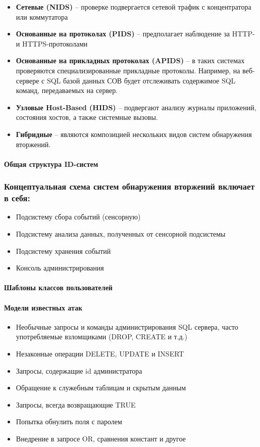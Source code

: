 \begin{itemize}
	\item \textbf{Сетевые (NIDS)} -- проверке подвергается сетевой трафик с концентратора или коммутатора
	\item \textbf{Основанные на протоколах (PIDS)} -- предполагает наблюдение за HTTP- и HTTPS-протоколами
	\item \textbf{Основанные на прикладных протоколах (APIDS)} -- в таких системах проверяются специализированные прикладные протоколы. Например, на веб-сервере с SQL базой данных СОВ будет отслеживать содержимое SQL команд, передаваемых на сервер.
	\item \textbf{Узловые Host-Based (HIDS)} -- подвергают анализу журналы приложений, состояния хостов, а также системные вызовы.
	\item \textbf{Гибридные} -- являются композицией нескольких видов систем обнаружения вторжений.
\end{itemize}

\paragraph{Общая структура ID-систем} 

\subsubsection*{Концептуальная схема систем обнаружения вторжений включает в себя:}
\begin{itemize}
	\item Подсистему сбора событий (сенсорную)
	\item Подсистему анализа данных, полученных от сенсорной подсистемы
	\item Подсистему хранения событий
	\item Консоль администрирования
\end{itemize}

\paragraph{Шаблоны классов пользователей}

\paragraph{Модели известных атак}
\begin{itemize}
	\item Необычные запросы и команды администрирования SQL сервера, часто употребляемые взломщиками (DROP, CREATE и т.д.)
	\item Незаконные операции DELETE, UPDATE и INSERT
	\item Запросы, содержащие id администратора
	\item Обращение к служебным таблицам и скрытым данным
	\item Запросы, всегда возвращающие TRUE
	\item Попытка обнулить поля с паролем
	\item Внедрение в запросе OR, сравнения констант и другое
\end{itemize}

